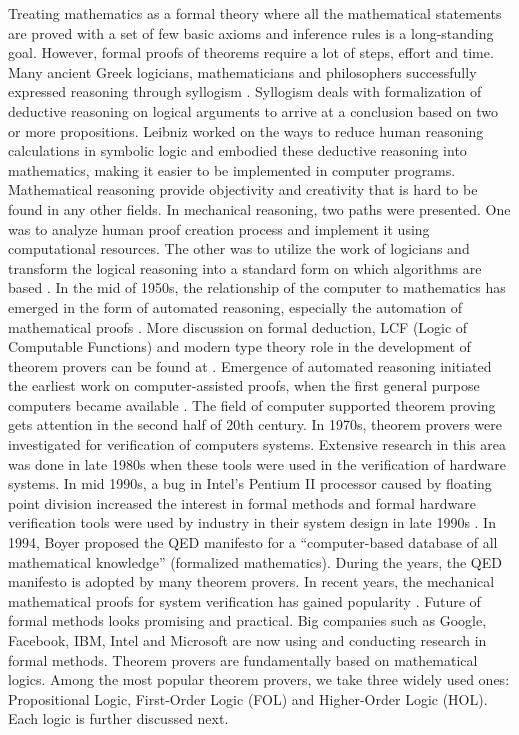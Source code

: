 Treating mathematics as a formal theory where all the mathematical statements are proved with a set of few basic axioms 
and inference rules is a long-standing goal. However, formal proofs of theorems require a lot of steps, effort and time. 
Many ancient Greek logicians, mathematicians and philosophers successfully 
expressed reasoning through syllogism . Syllogism deals with formalization of deductive reasoning on logical arguments to 
arrive at a conclusion based on two or more propositions. Leibniz worked on the ways to reduce human reasoning calculations in symbolic 
logic and embodied these deductive reasoning into mathematics, making it easier to be 
implemented in computer programs. 
Mathematical reasoning provide objectivity and creativity that is hard to be found in any 
other fields. In mechanical reasoning, two paths were presented. One was to analyze human proof creation process and implement it using
computational resources. The other was to utilize the work of logicians and transform the logical reasoning into a standard form on which 
algorithms are based . In the mid of 1950s, the relationship of the computer to mathematics has emerged in the form of 
automated reasoning, especially the automation of mathematical proofs . More discussion on formal deduction,
LCF (Logic of Computable Functions) and modern type theory role in the development of theorem provers can be found at .
Emergence of automated reasoning initiated the earliest work on computer-assisted proofs, when the first general purpose computers became 
available . The field of computer supported theorem proving gets attention in the second half of 20th century.
In 1970s, theorem provers were investigated for verification of computers systems. 
Extensive research in 
this area was done in late 1980s when these tools were used in the verification of hardware systems. In mid 1990s, a bug  
in Intel's Pentium II processor caused by floating point division increased the interest in formal methods and formal hardware verification tools 
were used by industry in their system design in late 1990s . In 1994, Boyer proposed the QED manifesto  for a 
``computer-based database of all mathematical knowledge'' (formalized mathematics). During the years, the QED manifesto is adopted by many 
theorem provers. In recent years, the mechanical mathematical proofs for system verification has gained popularity . 
Future of formal methods looks promising 
and practical. Big companies such as Google, Facebook, IBM, Intel and Microsoft are now using and conducting research in formal methods. 
Theorem provers are fundamentally based on mathematical logics. Among the most popular theorem provers, we take three widely used ones: 
Propositional Logic, First-Order Logic (FOL) and Higher-Order Logic (HOL). Each logic is further discussed next.

